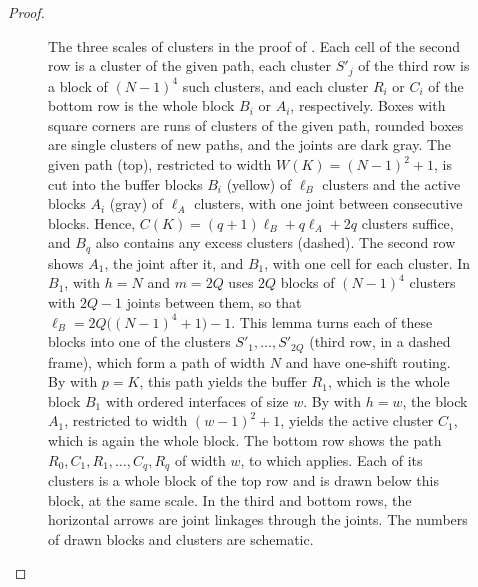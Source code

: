 \documentclass[fontsize=12pt,leading=14pt]{fullpaper}
\newcounter{step}
\begin{document}
\begin{proof}
\begin{figure}[ht]
    \caption{The three scales of clusters in the proof of .
      Each cell of the second row is a cluster of the given path, each cluster $S'_j$ of the third row is a block of $(N-1)^4$ such clusters, and each cluster $R_i$ or $C_i$ of the bottom row is the whole block $B_i$ or $A_i$, respectively.
      Boxes with square corners are runs of clusters of the given path, rounded boxes are single clusters of new paths, and the joints are dark gray.
      The given path (top), restricted to width $W(K)=(N-1)^2+1$, is cut into the buffer blocks $B_i$ (yellow) of $\ell_B$ clusters and the active blocks $A_i$ (gray) of $\ell_A$ clusters, with one joint between consecutive blocks.
      Hence, $C(K)=(q+1)\ell_B+q\ell_A+2q$ clusters suffice, and $B_q$ also contains any excess clusters (dashed).
      The second row shows $A_1$, the joint after it, and $B_1$, with one cell for each cluster.
      In $B_1$,  with $h=N$ and $m=2Q$ uses $2Q$ blocks of $(N-1)^4$ clusters with $2Q-1$ joints between them, so that $\ell_B=2Q\bigl((N-1)^4+1\bigr)-1$.
      This lemma turns each of these blocks into one of the clusters $S'_1,\dots,S'_{2Q}$ (third row, in a dashed frame), which form a path of width $N$ and have one-shift routing.
      By  with $p=K$, this path yields the buffer $R_1$, which is the whole block $B_1$ with ordered interfaces of size $w$.
      By  with $h=w$, the block $A_1$, restricted to width $(w-1)^2+1$, yields the active cluster $C_1$, which is again the whole block.
      The bottom row shows the path $R_0,C_1,R_1,\dots,C_q,R_q$ of width $w$, to which  applies.
      Each of its clusters is a whole block of the top row and is drawn below this block, at the same scale.
      In the third and bottom rows, the horizontal arrows are joint linkages through the joints.
    The numbers of drawn blocks and clusters are schematic.}
    \label{fig:s3-scales}
  \end{figure}


\end{proof}
\end{document}

